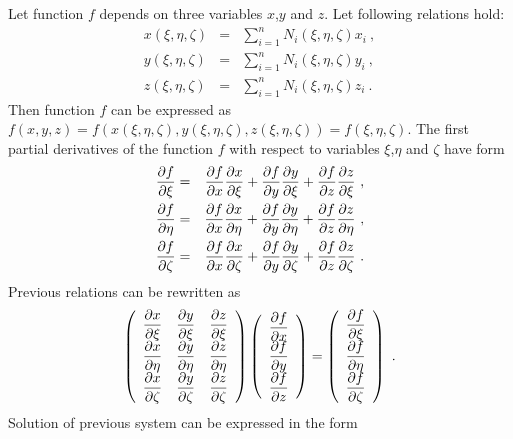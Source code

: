 Let function $f$ depends on three variables $x$,$y$ and $z$. Let following
relations hold:
\begin{eqnarray}
x(\xi,\eta,\zeta) &=& \sum_{i=1}^{n} N_i(\xi,\eta,\zeta) x_i\ ,
\\
y(\xi,\eta,\zeta) &=& \sum_{i=1}^{n} N_i(\xi,\eta,\zeta) y_i\ ,
\\
z(\xi,\eta,\zeta) &=& \sum_{i=1}^{n} N_i(\xi,\eta,\zeta) z_i\ .
\end{eqnarray}
Then function $f$ can be expressed as
$f(x,y,z)=f(x(\xi,\eta,\zeta),y(\xi,\eta,\zeta),z(\xi,\eta,\zeta))=f(\xi,\eta,\zeta)$. The first partial
derivatives of the function $f$ with respect to variables $\xi$,$\eta$ and $\zeta$ have form
\begin{eqnarray}
\ppd{f}{\xi} &=& \ppd{f}{x}\ppd{x}{\xi} + \ppd{f}{y}\ppd{y}{\xi} + \ppd{f}{z}\ppd{z}{\xi}\ ,
\\
\ppd{f}{\eta} &=& \ppd{f}{x}\ppd{x}{\eta} + \ppd{f}{y}\ppd{y}{\eta} + \ppd{f}{z}\ppd{z}{\eta}\ ,
\\
\ppd{f}{\zeta} &=& \ppd{f}{x}\ppd{x}{\zeta} + \ppd{f}{y}\ppd{y}{\zeta} + \ppd{f}{z}\ppd{z}{\zeta}\ .
\end{eqnarray}
Previous relations can be rewritten as
\begin{equation}
\left(\begin{array}{ccc}
\ppd{x}{\xi} & \ppd{y}{\xi} & \ppd{z}{\xi}
\\
\ppd{x}{\eta} & \ppd{y}{\eta} & \ppd{z}{\eta}
\\
\ppd{x}{\zeta} & \ppd{y}{\zeta} & \ppd{z}{\zeta}
\end{array}\right)
\left(\begin{array}{c}
\ppd{f}{x}
\\
\ppd{f}{y}
\\
\ppd{f}{z}
\end{array}\right)
=
\left(\begin{array}{c}
\ppd{f}{\xi}
\\
\ppd{f}{\eta}
\\
\ppd{f}{\zeta}
\end{array}\right)\ .
\end{equation}
Solution of previous system can be expressed in the form
